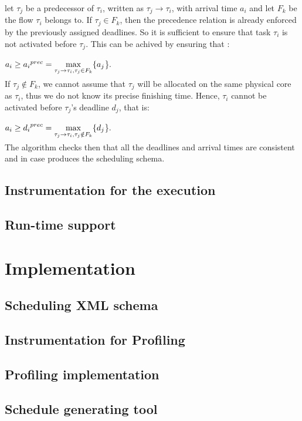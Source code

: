 \documentclass[a4paper,11pt,oneside]{book}
\begin{document}
let $\tau_j$ be a predecessor of $\tau_i$, written as $\tau_j \rightarrow \tau_i$, with arrival time $a_i$ and let $F_k$ be the flow $\tau_i$ belongs to. If $\tau_j \in F_k$, then the precedence relation is already enforced by the previously assigned deadlines. So it is sufficient to ensure that task $\tau_i$ is not activated before $\tau_j$. This can be achived by ensuring that :
\begin{center}$ a_i \ge  {a_i}^{prec} = \smash{\displaystyle\max_{\tau_j \rightarrow \tau_i,\tau_j \in F_k} }\{a_j$\}.\end{center}
If $\tau_j \notin F_k$, we cannot assume that $\tau_j$ will be allocated on the same physical core as $\tau_i$, thus we do not know its precise finishing time. Hence, $\tau_i$ cannot be activated before $\tau_j$'s deadline $d_j$, that is:
\begin{center}$ a_i \ge  {d_i}^{prec} = \smash{\displaystyle\max_{\tau_j \rightarrow \tau_i,\tau_j \notin F_k} }\{d_j$\}.\end{center}
The algorithm checks then that all the deadlines and arrival times are consistent and in case produces the scheduling schema.

\section{Instrumentation for the execution}
\section{Run-time support}

\chapter{Implementation}
\section{Scheduling XML schema}
\section{Instrumentation for Profiling}
\section{Profiling implementation}
\section{Schedule generating tool}
\end{document}
